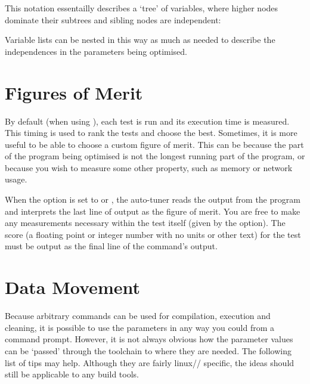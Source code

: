 \documentclass[a4paper, draft]{article}
\begin{document}
This notation essentailly describes a `tree' of 
variables, where higher nodes dominate their subtrees and sibling nodes are 
independent:
\treeDrawABCDEF

Variable lists can be nested in this way as much as needed to describe 
the independences in the parameters being optimised.





\section{Figures of Merit}
\label{sec:custom-fom}
By default (when using ), each test is run and 
its execution time is measured. This timing is used to rank the tests and 
choose the best. Sometimes, it is more useful to be able to choose a custom 
figure of merit. This can be because the part of the program being optimised 
is not the longest running part of the program, or because you wish to measure 
some other property, such as memory or network usage.

When the  option is set to  or 
, the auto-tuner reads the output from the program and 
interprets the last line of output as the figure of merit. 
You are free to make any measurements necessary within the test itself 
(given by the  option). The score (a floating point or 
integer number with no units or other text) for the test must be output as 
the final line of the command's output.










\clearpage

\section{Data Movement}
Because arbitrary commands can be used for compilation, execution and cleaning, 
it is possible to use the parameters in any way you could from a command 
prompt. However, it is not always obvious how the parameter values can be 
`passed' through the toolchain to where they are needed. The following list of 
tips may help. Although they are fairly linux// 
specific, the ideas should still be applicable to any build tools.

\end{document}
